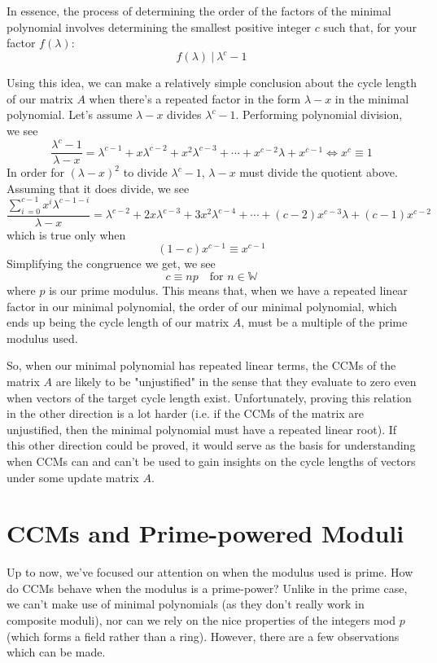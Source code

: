 \documentclass[a4paper, 12pt, reqno]{amsart}
\begin{document}
	In essence, the process of determining the order of the factors of the minimal polynomial involves determining the smallest positive integer $c$ such that, for your
	factor $f(\lambda)$:
	\[
		f(\lambda) \ | \ \lambda^{c} - 1
	\]
	
	Using this idea, we can make a relatively simple conclusion about the cycle length of our matrix $A$ when there's a repeated factor in the form $\lambda - x$ in the
	minimal polynomial. Let's assume $\lambda - x$ divides $\lambda^{c} - 1$. Performing polynomial division, we see
	\[
		\frac{\lambda^{c} - 1}{\lambda - x} = \lambda^{c-1} + x\lambda^{c-2} + x^{2}\lambda^{c-3} + \cdots + x^{c-2}\lambda + x^{c-1} \iff x^{c} \equiv 1
	\]
	In order for $(\lambda - x)^{2}$ to divide $\lambda^{c} - 1$, $\lambda - x$ must divide the quotient above. Assuming that it does divide, we see
	\[
		\frac{\sum_{i \, = 0}^{c-1} x^{i}\lambda^{c-1-i}}{\lambda - x} = \lambda^{c-2} + 2x\lambda^{c-3} + 3x^{2}\lambda^{c-4} + \cdots + 
		                                                                 (c-2)x^{c-3}\lambda + (c-1)x^{c-2}
	\]
	which is true only when
	\[
		(1-c)x^{c-1} \equiv x^{c-1}
	\]
	Simplifying the congruence we get, we see
	\[
		c \equiv np \quad \text{for } n \in \mathds{W}
	\]
	where $p$ is our prime modulus. This means that, when we have a repeated linear factor in our minimal polynomial, the order of our minimal polynomial,
	which ends up being the cycle length of our matrix $A$, must be a multiple of the prime modulus used. 
	
	So, when our minimal polynomial has repeated linear terms, the CCMs of the matrix $A$ are likely to be "unjustified" in the sense that they evaluate to zero even when
	vectors of the target cycle length exist. Unfortunately, proving this relation in the other direction is a lot harder (i.e. if the CCMs of the matrix are unjustified,
	then the minimal polynomial must have a repeated linear root). If this other direction could be proved, it would serve as the basis for understanding when CCMs can and
	can't be used to gain insights on the cycle lengths of vectors under some update matrix $A$.
	
	\section{CCMs and Prime-powered Moduli}
	Up to now, we've focused our attention on when the modulus used is prime. How do CCMs behave when the modulus is a prime-power? Unlike in the prime case, we can't
	make use of minimal polynomials (as they don't really work in composite moduli), nor can we rely on the nice properties of the integers mod $p$ (which forms a field
	rather than a ring). However, there are a few observations which can be made.
	
\end{document}
